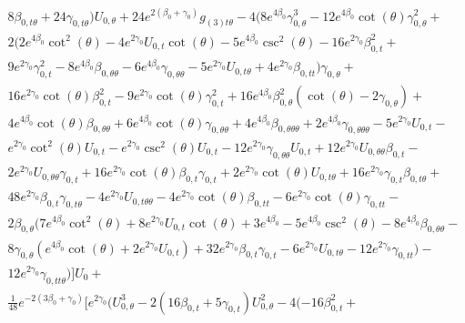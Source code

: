 \documentclass[a4paper,11pt]{article}
\numberwithin{equation}{section}
\begin{document}
\begin{align}
\begin{split}
&8 \beta_{0, t \theta} +24 \gamma_{0, t \theta} ) U_{0, \theta}+24 e^{2 (\beta_{0}+\gamma_{0})} g_{(3) t \theta}-4 (8 e^{4 \beta_{0}} \gamma_{0, \theta}^3-12 e^{4 \beta_{0}} \cot (\theta ) \gamma_{0, \theta}^2+\\
&2 (2 e^{4 \beta_{0}} \cot ^2(\theta )-4 e^{2 \gamma_{0}} U_{0, t}  \cot (\theta )-5 e^{4 \beta_{0}} \csc ^2(\theta )-16 e^{2 \gamma_{0}} \beta_{0, t} ^2+\\
&9 e^{2 \gamma_{0}} \gamma_{0, t} ^2-8 e^{4 \beta_{0}} \beta_{0, \theta \theta}-6 e^{4 \beta_{0}} \gamma_{0, \theta \theta}-5 e^{2 \gamma_{0}} U_{0, t \theta} +4 e^{2 \gamma_{0}} \beta_{0, tt}) \gamma_{0, \theta}+\\
&16 e^{2 \gamma_{0}} \cot (\theta ) \beta_{0, t} ^2-9 e^{2 \gamma_{0}} \cot (\theta ) \gamma_{0, t} ^2+16 e^{4 \beta_{0}} \beta_{0, \theta}^2 (\cot (\theta )-2 \gamma_{0, \theta})+\\
&4 e^{4 \beta_{0}} \cot (\theta ) \beta_{0, \theta \theta}+6 e^{4 \beta_{0}} \cot (\theta ) \gamma_{0, \theta \theta}+4 e^{4 \beta_{0}} \beta_{0, \theta \theta \theta} +2 e^{4 \beta_{0}} \gamma_{0, \theta \theta \theta} -5 e^{2 \gamma_{0}} U_{0, t} -\\
&e^{2 \gamma_{0}} \cot ^2(\theta ) U_{0, t} -e^{2 \gamma_{0}} \csc ^2(\theta ) U_{0, t} -12 e^{2 \gamma_{0}} \gamma_{0, \theta \theta} U_{0, t} +12 e^{2 \gamma_{0}} U_{0, \theta \theta} \beta_{0, t} -\\
&2 e^{2 \gamma_{0}} U_{0, \theta \theta} \gamma_{0, t} +16 e^{2 \gamma_{0}} \cot (\theta ) \beta_{0, t}  \gamma_{0, t} +2 e^{2 \gamma_{0}} \cot (\theta ) U_{0, t \theta} +16 e^{2 \gamma_{0}} \gamma_{0, t}  \beta_{0, t \theta} +\\
&48 e^{2 \gamma_{0}} \beta_{0, t}  \gamma_{0, t \theta} -4 e^{2 \gamma_{0}} U_{0, t \theta \theta}-4 e^{2 \gamma_{0}} \cot (\theta ) \beta_{0, tt}-6 e^{2 \gamma_{0}} \cot (\theta ) \gamma_{0, tt}-\\
&2 \beta_{0, \theta} (7 e^{4 \beta_{0}} \cot ^2(\theta )+8 e^{2 \gamma_{0}} U_{0, t}  \cot (\theta )+3 e^{4 \beta_{0}}-5 e^{4 \beta_{0}} \csc ^2(\theta )-8 e^{4 \beta_{0}} \beta_{0, \theta \theta}-\\
&8 \gamma_{0, \theta} (e^{4 \beta_{0}} \cot (\theta )+2 e^{2 \gamma_{0}} U_{0, t} )+32 e^{2 \gamma_{0}} \beta_{0, t}  \gamma_{0, t} -6 e^{2 \gamma_{0}} U_{0, t \theta} -12 e^{2 \gamma_{0}} \gamma_{0, tt})-\\
&12 e^{2 \gamma_{0}} \gamma_{0, tt \theta})] U_{0}+\\
&\frac{1}{48} e^{-2 (3 \beta_{0}+\gamma_{0})} [e^{2 \gamma_{0}} (U_{0, \theta}^3-2 (16 \beta_{0, t} +5 \gamma_{0, t} ) U_{0, \theta}^2-4 (-16 \beta_{0, t} ^2+\\

\end{split}
\end{align}
\end{document}
